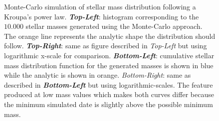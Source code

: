 \begin{figure}[!ht]
\centering
\caption{\scriptsize{Monte-Carlo simulation of stellar mass distribution following a Kroupa's power law. \textit{\textbf{Top-Left}}: histogram corresponding to the $10.000$ stellar masses generated using the Monte-Carlo approach. The orange line represents the analytic shape the distribution should follow. \textit{\textbf{Top-Right}}: same as figure described in \textit{Top-Left} but using logarithmic x-scale for comparison. \textit{\textbf{Bottom-Left}}: cumulative stellar mass distribution function for the generated masses is shown in blue while the analytic is shown in orange. \textit{Bottom-Right}: same as described in \textit{\textbf{Bottom-Left}} but using logarithmic-scales. The feature produced at low mass values which makes both curves differ because the minimum simulated date is slightly above the possible minimum mass.%
}}
\label{fig:Kroupa_IMF}
\end{figure}

